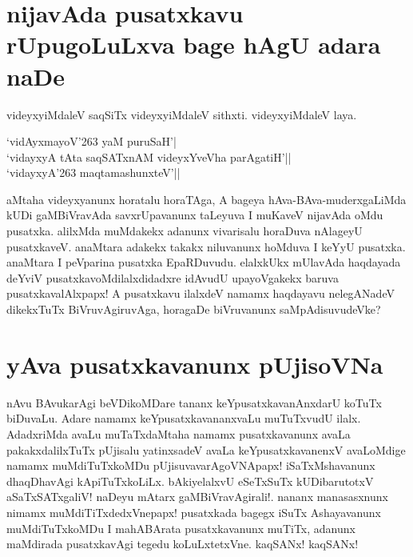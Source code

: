 \section*{nijavAda pusatxkavu rUpugoLuLxva bage hAgU adara naDe}

videyxyiMdaleV saqSiTx videyxyiMdaleV sithxti. videyxyiMdaleV laya.

\begin{shloka}
`vidAyxmayoV\char'263 yaM puruSaH'|\label{133b}\\
`vidayxyA tAta saqSATxnAM videyxYveVha parAgatiH'||\label{133}\\
`vidayxyA\char'263 maqtamashunxteV'||\label{133a}
\end{shloka}
aMtaha videyxyanunx horatalu horaTAga, A bageya hAva-BAva-muderxgaLiMda kUDi gaMBiVravAda savxrUpavanunx taLeyuva I muKaveV nijavAda oMdu pusatxka. alilxMda muMdakekx adanunx vivarisalu horaDuva nAlageyU pusatxkaveV. anaMtara adakekx takakx niluvanunx hoMduva I keYyU pusatxka. anaMtara I peVparina pusatxka EpaRDuvudu. elalxkUkx mUlavAda haqdayada deYviV pusatxkavoMdilalxdidadxre idAvudU upayoVgakekx baruva pusatxkavalAlxpapx! A pusatxkavu ilalxdeV namamx haqdayavu nelegANadeV dikekxTuTx BiVruvAgiruvAga, horagaDe biVruvanunx saMpAdisuvudeVke?

\section*{yAva pusatxkavanunx pUjisoVNa}

nAvu BAvukarAgi beVDikoMDare tananx keYpusatxkavanAnxdarU koTuTx biDuvaLu. Adare namamx keYpusatxkavananxvaLu muTuTxvudU ilalx. AdadxriMda avaLu muTaTxdaMtaha namamx pusatxkavanunx avaLa pakakxdalilxTuTx pUjisalu yatinxsadeV avaLa keYpusatxkavanenxV avaLoMdige namamx muMdiTuTxkoMDu pUjisuvavarAgoVNApapx! iSaTxMshavanunx dhaqDhavAgi kApiTuTxkoLiLx. bAkiyelalxvU eSeTxSuTx kUDibarutotxV aSaTxSATxgaliV! naDeyu mAtarx gaMBiVravAgirali!. nananx manasasxnunx nimamx muMdiTiTxdedxVnepapx! pusatxkada bagegx iSuTx Ashayavanunx muMdiTuTxkoMDu I mahABArata pusatxkavanunx muTiTx, adanunx maMdirada pusatxkavAgi tegedu koLuLxtetxVne. kaqSANx! kaqSANx!



